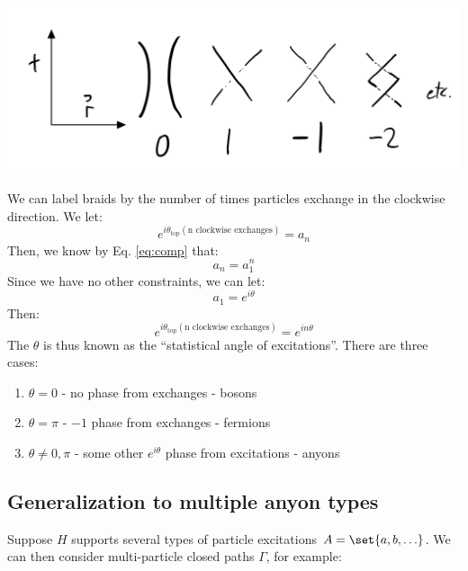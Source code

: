 \begin{center}
    \includegraphics[scale=0.35]{Lectures/Images/lec5-2dbraids.png}
\end{center}

We can label braids by the number of times particles exchange in the clockwise direction. We let:
\begin{equation}
    e^{i\theta_{\text{top}}(\text{n clockwise exchanges})} = a_n
\end{equation}
Then, we know by Eq. \eqref{eq:comp} that:
\begin{equation}
    a_n = a_1^n
\end{equation}
Since we have no other constraints, we can let:
\begin{equation}
    a_1 = e^{i\theta}
\end{equation}
Then:
\begin{equation}
    e^{i\theta_{\text{top}}(\text{n clockwise exchanges})} = e^{in\theta}
\end{equation}
The $\theta$ is thus known as the ``statistical angle of excitations''. There are three cases:
\begin{enumerate}
    \item $\theta = 0$ - no phase from exchanges - bosons
    \item $\theta = \pi$ - $-1$ phase from exchanges - fermions
    \item $\theta \neq 0, \pi$ - some other $e^{i\theta}$ phase from excitations - anyons
\end{enumerate}

\subsection{Generalization to multiple anyon types}
Suppose $H$ supports several types of particle excitations $A = \set{a, b, \ldots}$. We can then consider multi-particle closed paths $\Gamma$, for example:


